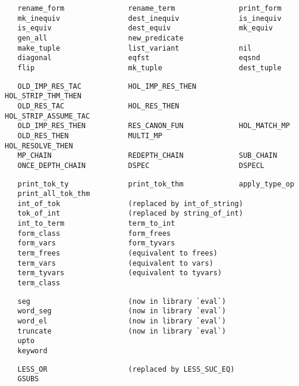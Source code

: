 \begin{hol}\begin{verbatim}
   rename_form               rename_term               print_form
   mk_inequiv                dest_inequiv              is_inequiv
   is_equiv                  dest_equiv                mk_equiv
   gen_all                   new_predicate
   make_tuple                list_variant              nil
   diagonal                  eqfst                     eqsnd
   flip                      mk_tuple                  dest_tuple
\end{verbatim}\end{hol}
\begin{hol}\begin{verbatim}
   OLD_IMP_RES_TAC           HOL_IMP_RES_THEN          HOL_STRIP_THM_THEN
   OLD_RES_TAC               HOL_RES_THEN              HOL_STRIP_ASSUME_TAC
   OLD_IMP_RES_THEN          RES_CANON_FUN             HOL_MATCH_MP
   OLD_RES_THEN              MULTI_MP                  HOL_RESOLVE_THEN
   MP_CHAIN                  REDEPTH_CHAIN             SUB_CHAIN
   ONCE_DEPTH_CHAIN          DSPEC                     DSPECL
\end{verbatim}\end{hol}
\begin{hol}\begin{verbatim}
   print_tok_ty              print_tok_thm             apply_type_op
   print_all_tok_thm
   int_of_tok                (replaced by int_of_string)
   tok_of_int                (replaced by string_of_int)
   int_to_term               term_to_int
   form_class                form_frees
   form_vars                 form_tyvars
   term_frees                (equivalent to frees)
   term_vars                 (equivalent to vars)
   term_tyvars               (equivalent to tyvars)
   term_class
\end{verbatim}\end{hol}
\begin{hol}\begin{verbatim}
   seg                       (now in library `eval`)
   word_seg                  (now in library `eval`)
   word_el                   (now in library `eval`)
   truncate                  (now in library `eval`)
   upto
   keyword
\end{verbatim}\end{hol}
\begin{hol}\begin{verbatim}
   LESS_OR                   (replaced by LESS_SUC_EQ)
   GSUBS
\end{verbatim}\end{hol}
